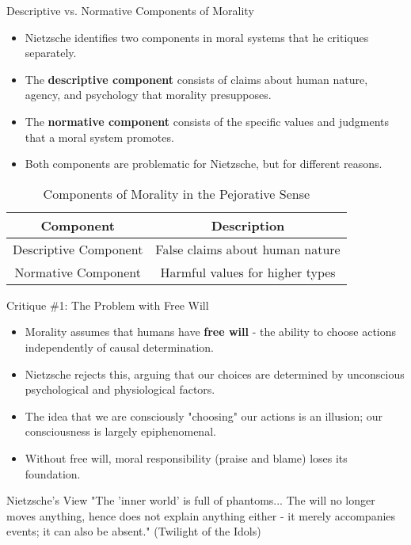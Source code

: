 \documentclass{beamer}
\begin{document}
 
\begin{frame}{Descriptive vs. Normative Components of Morality}
\begin{itemize}
\item Nietzsche identifies two components in moral systems that he critiques separately.
\item The \textbf{descriptive component} consists of claims about human nature, agency, and psychology that morality presupposes.
\item The \textbf{normative component} consists of the specific values and judgments that a moral system promotes.
\item Both components are problematic for Nietzsche, but for different reasons.
\end{itemize}

\begin{table}
\centering
\begin{tabular}{|c|c|}
\hline
\textbf{Component} & \textbf{Description} \\
\hline
Descriptive Component & False claims about human nature \\
\hline
Normative Component & Harmful values for higher types \\
\hline
\end{tabular}
\caption{Components of Morality in the Pejorative Sense}
\end{table}   
\end{frame}

\begin{frame}{Critique \#1: The Problem with Free Will}
\begin{itemize}
\item Morality assumes that humans have \textbf{free will} - the ability to choose actions independently of causal determination.
\item Nietzsche rejects this, arguing that our choices are determined by unconscious psychological and physiological factors.
\item The idea that we are consciously "choosing" our actions is an illusion; our consciousness is largely epiphenomenal.
\item Without free will, moral responsibility (praise and blame) loses its foundation.
\end{itemize}

\begin{exampleblock}{Nietzsche's View}
"The 'inner world' is full of phantoms... The will no longer moves anything, hence does not explain anything either - it merely accompanies events; it can also be absent." (Twilight of the Idols)
\end{exampleblock}
\end{frame}
\end{document}
